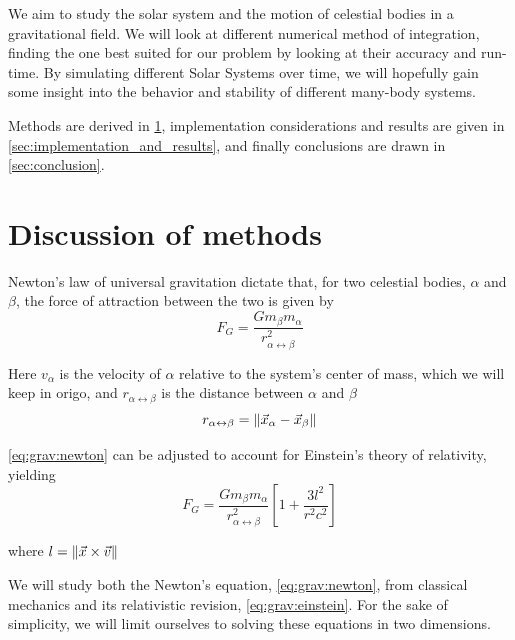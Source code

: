 \documentclass[a4paper]{article}
\begin{document}
We aim to study the solar system and the motion of celestial bodies in a gravitational field. We will look at different numerical method of integration, finding the one best suited for our problem by looking at their accuracy and run-time. By simulating different Solar Systems over time, we will hopefully gain some insight into the behavior and stability of different many-body systems.

Methods are derived in \ref{sec:methods}, implementation considerations and results are given in \ref{sec:implementation_and_results}, and finally conclusions are drawn in \ref{sec:conclusion}.



\section{Discussion of methods}\label{sec:methods}
Newton's law of universal gravitation dictate that, for two celestial bodies, $\alpha$ and $\beta$, the force of attraction between the two is given by
\begin{equation}
F_G
=\frac{Gm_{\beta}m_{\alpha}}{r_{\alpha \leftrightarrow \beta}^2}
\label{eq:grav:newton}
\end{equation}


Here $v_{\alpha}$ is the velocity of $\alpha$ relative to the system's center of mass, which we will keep in origo, and $r_{\alpha \leftrightarrow \beta}$ is the distance between $\alpha$ and $\beta$
\begin{equation}
r_{\alpha \leftrightarrow \beta} = \norm{ \vec{x}_{\alpha} - \vec{x}_{\beta} }
\end{equation}

\ref{eq:grav:newton} can be adjusted to account for Einstein's theory of relativity, yielding
\begin{equation}
F_G
=\frac{Gm_{\beta}m_{\alpha}}{r_{\alpha \leftrightarrow \beta}^2}
\left[1 + \frac{3l^2}{r^2c^2}\right]
\label{eq:grav:einstein}
\end{equation}

where $l = \norm{\vec{x} \times \vec{v}}$

We will study both the Newton's equation, \ref{eq:grav:newton}, from classical mechanics and its relativistic revision, \ref{eq:grav:einstein}. For the sake of simplicity, we will limit ourselves to solving these equations in two dimensions.
\end{document}
